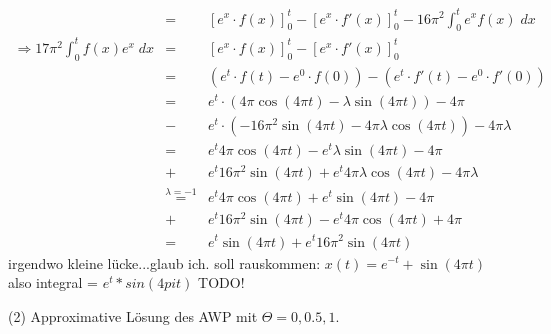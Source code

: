 \documentclass[11pt,a4paper,ngerman]{article}
\begin{document}
\begin{description}
\begin{eqnarray*}
&=& [e^{x} \cdot f(x)]_0^t - [e^{x} \cdot f'(x)]_0^t - 16 \pi^2 \int_0^t e^x f(x) \; dx \\
\Rightarrow 17 \pi^2 \int_0^t f(x)e^{x} \; dx &=& [e^{x} \cdot f(x)]_0^t - [e^{x} \cdot f'(x)]_0^t \\
&=& (e^t \cdot f(t) -  e^0 \cdot f(0)) - (e^t \cdot f'(t) -  e^0 \cdot f'(0)) \\
&=& e^t \cdot (4\pi \cos(4\pi t) - \lambda \sin(4\pi t)) - 4 \pi \\
&-& e^t \cdot (-16 \pi^2 \sin(4 \pi t) - 4 \pi \lambda \cos(4 \pi t)) - 4\pi \lambda \\
&=& e^t 4\pi \cos(4\pi t) - e^t \lambda \sin(4\pi t) - 4\pi \\
&+& e^t 16 \pi^2 \sin(4 \pi t) + e^t 4 \pi \lambda \cos(4 \pi t) - 4\pi \lambda \\
&\stackrel{\lambda = -1}{=}& e^t 4\pi \cos(4\pi t) + e^t \sin(4 \pi t) - 4\pi \\\
&+& e^t 16 \pi^2 \sin(4 \pi t) - e^t 4 \pi \cos(4 \pi t) + 4 \pi \\
&=& e^t \sin(4 \pi t) + e^t 16 \pi^2 \sin(4 \pi t)
\end{eqnarray*}
irgendwo kleine lücke...glaub ich.
soll rauskommen: 
$x(t) = e^{-t} + \sin(4\pi t)$
also integral = $e^t * sin(4pi t)$
TODO!

(2) Approximative Lösung des AWP mit $\Theta = 0, 0.5, 1$. \\



\end{description}
\end{document}
